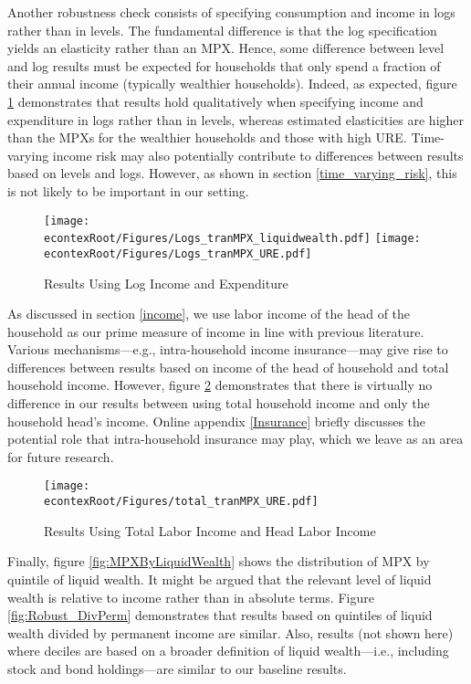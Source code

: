 \documentclass[titlepage]{\econtex}\newcommand{\texname}{ConsumptionHeterogeneity}
\begin{document}
	Another robustness check consists of specifying consumption and income in logs rather than in levels. The fundamental difference is that the log specification yields an elasticity rather than an MPX. Hence, some difference between level and log results must be expected for households that only spend a fraction of their annual income (typically wealthier households). Indeed, as expected, figure \ref{fig:Robust_Logs} demonstrates that results hold qualitatively when specifying income and expenditure in logs rather than in levels, whereas estimated elasticities are higher than the MPXs for the wealthier households and those with high URE. Time-varying income risk may also potentially contribute to differences between results based on levels and logs. However, as shown in section \ref{time_varying_risk}, this is not likely to be important in our setting.  
	
	\begin{figure} 
		\begin{centering}
			\texttt{[image: \\econtexRoot/Figures/Logs\_tranMPX\_liquidwealth.pdf]}
			\texttt{[image: \\econtexRoot/Figures/Logs\_tranMPX\_URE.pdf]}
			\caption{Results Using Log Income and Expenditure}
			\label{fig:Robust_Logs}
		\end{centering}
	\end{figure}
	
	As discussed in section \ref{income}, we use labor income of the head of the household as our prime measure of income in line with previous literature. Various mechanisms---e.g., intra-household income insurance---may give rise to differences between results based on income of the head of household and total household income. However, figure \ref{fig:Robust_TotalvsHead} demonstrates that there is virtually no difference in our results between using total household income and only the household head's income. Online appendix \ref{Insurance} briefly discusses the potential role that intra-household insurance may play, which we leave as an area for future research. 
	
	\begin{figure} 
		\begin{centering}
			\texttt{[image: \\econtexRoot/Figures/total\_tranMPX\_URE.pdf]}
			\caption{Results Using Total Labor Income and Head Labor Income}
			\label{fig:Robust_TotalvsHead}
		\end{centering}
	\end{figure}
	
	Finally, figure \ref{fig:MPXByLiquidWealth} shows the distribution of MPX by quintile of liquid wealth. It might be argued that the relevant level of liquid wealth is relative to income rather than in absolute terms. Figure \ref{fig:Robust_DivPerm} demonstrates that results based on quintiles of liquid wealth divided by permanent income are similar. Also, results (not shown here) where deciles are based on a broader definition of liquid wealth---i.e., including stock and bond holdings---are similar to our baseline results. 
	
\end{document}
